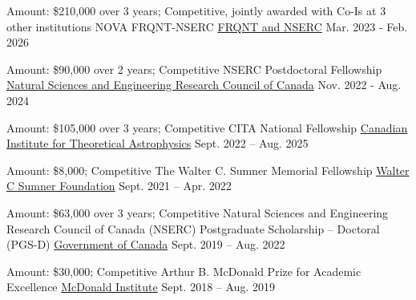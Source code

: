 
\begin{cventries}

  \cventry
    {Amount: \$210,000 over 3 years; Competitive, jointly awarded with Co-Is at 3 other institutions} %
    {NOVA FRQNT-NSERC} %
    {\href{https://frq.gouv.qc.ca/en/lancement-du-programme-nova-frqnt-crsng-2/}{FRQNT and NSERC}} %
    {Mar. 2023 - Feb. 2026} %
    {}
    
  \cventry
    {Amount: \$90,000 over 2 years; Competitive} %
    {NSERC Postdoctoral Fellowship} %
    {\href{https://www.nserc-crsng.gc.ca/Students-Etudiants/PD-NP/PDF-BP_eng.asp}{Natural Sciences and Engineering Research Council of Canada}} %
    {Nov. 2022 - Aug. 2024} %
    {}
    
  \cventry
    {Amount: \$105,000 over 3 years; Competitive} %
    {CITA National Fellowship} %
    {\href{https://www.cita.utoronto.ca/}{Canadian Institute for Theoretical Astrophysics}} %
    {Sept. 2022 – Aug. 2025} %
    {}
 
  \cventry
    {Amount: \$8,000; Competitive} %
    {The Walter C. Sumner Memorial Fellowship} %
    {\href{https://apps.cra-arc.gc.ca/ebci/hacc/srch/pub/dsplyRprtngPrd?q.srchNmFltr=Walter+C+Sumner+Foundation&q.stts=0007&selectedCharityBn=887460194RR0001&dsrdPg=1}{Walter C Sumner Foundation}} %
    {Sept. 2021 – Apr. 2022} %
    {}
 
  \cventry
    {Amount: \$63,000 over 3 years; Competitive} %
    {Natural Sciences and Engineering Research Council of Canada (NSERC) Postgraduate Scholarship – Doctoral (PGS-D)} %
    {\href{https://www.nserc-crsng.gc.ca/students-etudiants/pg-cs/bellandpostgrad-belletsuperieures_eng.asp}{Government of Canada}} %
    {Sept. 2019 – Aug. 2022} %
    {}

  \cventry
    {Amount: \$30,000; Competitive} %
    {Arthur B. McDonald Prize for Academic Excellence} %
    {\href{https://mcdonaldinstitute.ca/}{McDonald Institute}} %
    {Sept. 2018 – Aug. 2019} %
    {}


\end{cventries}

